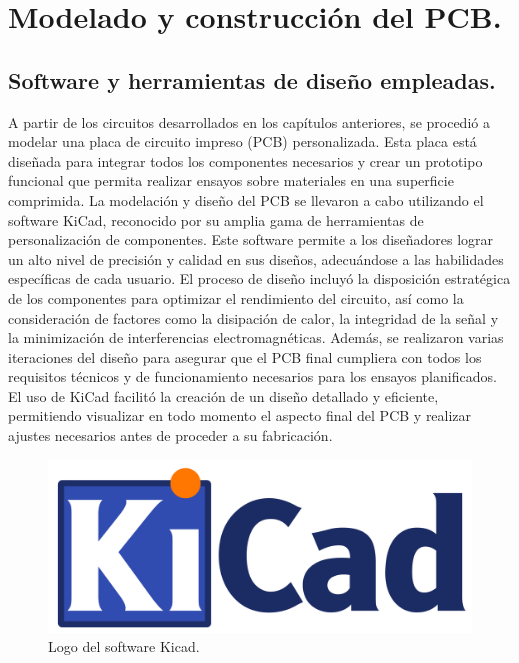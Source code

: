 \chapter{Modelado y construcción del PCB.}

\label{C:Modelado y construcción del PCB.}

\section{Software y herramientas de diseño empleadas.}

A partir de los circuitos desarrollados en los capítulos anteriores, se procedió a modelar una placa de circuito impreso (PCB) personalizada. Esta placa está diseñada para integrar todos los componentes necesarios y crear un prototipo funcional que permita realizar ensayos sobre materiales en una superficie comprimida.
La modelación y diseño del PCB se llevaron a cabo utilizando el software KiCad, reconocido por su amplia gama de herramientas de personalización de componentes. Este software permite a los diseñadores lograr un alto nivel de precisión y calidad en sus diseños, adecuándose a las habilidades específicas de cada usuario.
El proceso de diseño incluyó la disposición estratégica de los componentes para optimizar el rendimiento del circuito, así como la consideración de factores como la disipación de calor, la integridad de la señal y la minimización de interferencias electromagnéticas. Además, se realizaron varias iteraciones del diseño para asegurar que el PCB final cumpliera con todos los requisitos técnicos y de funcionamiento necesarios para los ensayos planificados.
El uso de KiCad facilitó la creación de un diseño detallado y eficiente, permitiendo visualizar en todo momento el aspecto final del PCB y realizar ajustes necesarios antes de proceder a su fabricación.
\begin{figure}[H]
    \centering
    \includegraphics[scale=0.03]{./imagenes/KiCad-Logo.svg_.png}
    \caption{Logo del software Kicad.}
    \label{F:kicad}
\end{figure}


